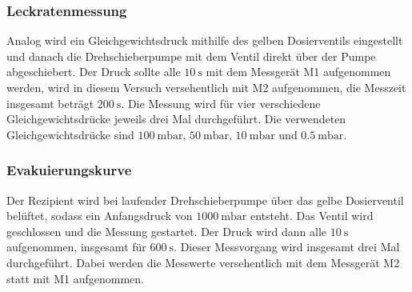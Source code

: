             \subsubsection{Leckratenmessung}
                Analog wird ein Gleichgewichtsdruck mithilfe des gelben Dosierventils eingestellt und danach die Drehschieberpumpe mit dem Ventil direkt über der Pumpe abgeschiebert.
                Der Druck sollte alle $\SI{10}{\second}$ mit dem Messgerät M1 aufgenommen werden, wird in diesem Versuch versehentlich mit M2 aufgenommen, die Messzeit insgesamt beträgt $\SI{200}{\second}$.
                Die Messung wird für vier verschiedene Gleichgewichtsdrücke jeweils drei Mal durchgeführt.
                Die verwendeten Gleichgewichtsdrücke sind $\SI{100}{\milli\bar},\, \SI{50}{\milli\bar},\, \SI{10}{\milli\bar}$ und $\SI{0.5}{\milli\bar}$.
            \subsubsection{Evakuierungskurve}
                Der Rezipient wird bei laufender Drehschieberpumpe über das gelbe Dosierventil belüftet, sodass ein Anfangsdruck von $\SI{1000}{\milli\bar}$ entsteht.
                Das Ventil wird geschlossen und die Messung gestartet.
                Der Druck wird dann alle $\SI{10}{\second}$ aufgenommen, insgesamt für $\SI{600}{\second}$.
                Dieser Messvorgang wird insgesamt drei Mal durchgeführt.
                Dabei werden die Messwerte versehentlich mit dem Messgerät M2 statt mit M1 aufgenommen.